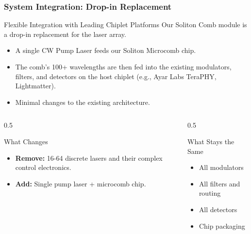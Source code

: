 \documentclass{beamer}
\begin{document}
\begin{frame}
    \frametitle{System Integration: Drop-in Replacement}
    
    \begin{block}{Flexible Integration with Leading Chiplet Platforms}
        Our Soliton Comb module is a drop-in replacement for the laser array.
        \begin{itemize}
            \item A single CW Pump Laser feeds our Soliton Microcomb chip.
            \item The comb's 100+ wavelengths are then fed into the existing modulators, filters, and detectors on the host chiplet (e.g., Ayar Labs TeraPHY, Lightmatter).
            \item Minimal changes to the existing architecture.
        \end{itemize}
    \end{block}
    
    \begin{columns}[T]
        \begin{column}{0.5\textwidth}
            \begin{alertblock}{What Changes}
                \begin{itemize}
                    \item \textbf{Remove:} 16-64 discrete lasers and their complex control electronics.
                    \item \textbf{Add:} Single pump laser + microcomb chip.
                \end{itemize}
            \end{alertblock}
        \end{column}
        \begin{column}{0.5\textwidth}
            \begin{block}{What Stays the Same}
                \begin{itemize}
                    \item All modulators
                    \item All filters and routing
                    \item All detectors
                    \item Chip packaging
                \end{itemize}
            \end{block}
        \end{column}
    \end{columns}
\end{frame}
\end{document}
